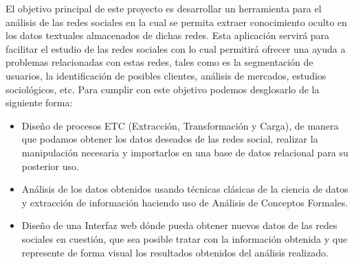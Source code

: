\documentclass[../../main.tex]{subfiles}
\begin{document}
El objetivo principal de este proyecto es desarrollar un herramienta para el análisis de las redes sociales en la cual se permita extraer conocimiento oculto en los datos textuales almacenados de dichas redes. Esta aplicación servirá para facilitar el estudio de las redes sociales con lo cual permitirá ofrecer una ayuda a problemas relacionadas con estas redes, tales como es la segmentación de usuarios, la identificación de posibles clientes, análisis de mercados, estudios sociológicos, etc.
Para cumplir con este objetivo podemos desglosarlo de la siguiente forma:
\begin{itemize}
\item Diseño de procesos ETC (Extracción, Transformación y Carga), de manera que podamos obtener los datos deseados de las redes social, realizar la manipulación necesaria y importarlos en una base de datos relacional para su posterior uso.
\item Análisis de los datos obtenidos usando técnicas clásicas de la ciencia de datos y extracción de información haciendo uso de Análisis de Conceptos Formales\cite{fca}. 
\item Diseño de una Interfaz web dónde pueda obtener nuevos datos de las redes sociales en cuestión, que sea posible tratar con la información obtenida y que represente de forma visual los resultados obtenidos del análisis realizado.
\end{itemize}
\end{document}
